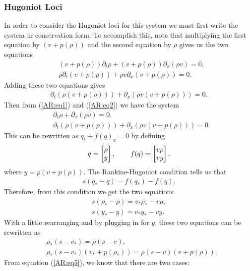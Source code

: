 \documentclass{article}
\begin{document}
\subsubsection{Hugoniot Loci}
In order to consider the Hugoniot loci for this system we must first write the system in conservation form. 
To accomplish this, note that multiplying the first equation by $(v + p(\rho ))$ and the second equation 
by $\rho$ gives us the two equations 
\begin{align*}
&(v + p(\rho ))\partial_t\rho + (v + p(\rho ))\partial_x(\rho v) = 0,  \\
&\rho\partial_t \left(v + p(\rho )\right) + \rho v\partial_x \left( v + p(\rho )\right) = 0.
\end{align*}
Adding these two equations gives
\begin{align}\label{AR:eq2}
\partial_t \left(\rho\left(v + p(\rho )\right)\right) + \partial_x \left( \rho v\left(v + p(\rho )\right)\right) = 0.
\end{align}
Then from (\ref{AR:eq1}) and (\ref{AR:eq2}) we have the system 
\begin{align*}
&\partial_t\rho + \partial_x(\rho v) = 0, \\
&\partial_t \left(\rho\left(v + p(\rho )\right)\right) + \partial_x \left( \rho v\left(v + p(\rho )\right)\right) = 0.
\end{align*}
This can be rewritten as $q_t + f(q)_x = 0$ by defining
\begin{align*}
q = \left[ \begin{matrix}
\rho \\ y
\end{matrix}\right], \hspace{0.3in}
f(q) = \left[ \begin{matrix}
v\rho \\
vy
\end{matrix}\right].
\end{align*}
where $y = \rho\left(v + p(\rho )\right)$.
The Rankine-Hugoniot condition tells us that 
\begin{align*}
s(q_*- q) = f(q_*) - f(q).
\end{align*}
Therefore, from this condition we get the two equations
\begin{align}
s(\rho_* - \rho) = v_*\rho_* - v\rho, \label{AR:eq3}\\
s(y_* - y) = v_*y_* - vy.\label{AR:eq4}
\end{align}
With a little rearranging and by plugging in for $y$, these two equations can be rewritten as
\begin{align}
&\rho_*(s - v_*) = \rho (s - v), \label{AR:eq5}\\
&\rho_*(s - v_*)\left(v_* + p(\rho_* )\right) = \rho(s - v)\left(v + p(\rho )\right).\label{AR:eq6}
\end{align}
From equation (\ref{AR:eq5}), we know that there are two cases: 
\end{document}

